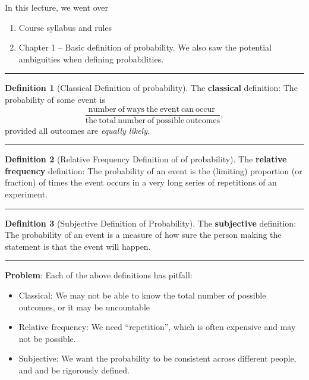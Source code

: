 \documentclass[
]{book}
\providecommand{\tightlist}{%
  \setlength{\itemsep}{0pt}\setlength{\parskip}{0pt}}
\theoremstyle{definition}
\newtheorem{definition}{Definition}[chapter]
\theoremstyle{definition}
\theoremstyle{definition}
\theoremstyle{definition}
\theoremstyle{remark}
\begin{document}
In this lecture, we went over

\begin{enumerate}
\def\labelenumi{\arabic{enumi}.}
\tightlist
\item
  Course syllabus and rules
\item
  Chapter 1 -- Basic definition of probability. We also saw the potential ambiguities when defining probabilities.
\end{enumerate}

\begin{center}\rule{0.5\linewidth}{0.5pt}\end{center}

\begin{definition}[Classical Definition of probability]
The \textbf{classical} definition: The probability of some event is
\[
\frac{\mathrm{number~of~ways~the~event~can~occur~}}
{\mathrm{{the~total~number~of~possible~outcomes}}},
\]
provided all outcomes are \emph{equally likely}.
\end{definition}

\begin{center}\rule{0.5\linewidth}{0.5pt}\end{center}

\begin{definition}[Relative Frequency Definition of of probability]
The \textbf{relative frequency} definition: The probability of an event
is the (limiting) proportion (or fraction) of times the event occurs in a very
long series of repetitions of an experiment.
\end{definition}

\begin{center}\rule{0.5\linewidth}{0.5pt}\end{center}

\begin{definition}[Subjective Definition of Probability]
The \textbf{subjective} definition: The probability of an event is a measure of how sure the person making the statement is that the event will happen.
\end{definition}

\begin{center}\rule{0.5\linewidth}{0.5pt}\end{center}

\textbf{Problem}: Each of the above definitions has pitfall:

\begin{itemize}
\tightlist
\item
  Classical: We may not be able to know the total number of possible outcomes, or it may be uncountable
\item
  Relative frequency: We need ``repetition'', which is often expensive and may not be possible.
\item
  Subjective: We want the probability to be consistent across different people, and and be rigorously defined.
\end{itemize}
\end{document}
